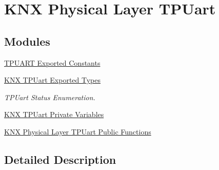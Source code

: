 \hypertarget{group___k_n_x___p_h___t_p_uart}{}\section{K\+NX Physical Layer T\+P\+Uart}
\label{group___k_n_x___p_h___t_p_uart}
\subsection*{Modules}
\begin{DoxyCompactItemize}
\item 
\hyperlink{group___k_n_x___p_h___t_p_uart___exported___constants}{T\+P\+U\+A\+R\+T Exported Constants}
\item 
\hyperlink{group___k_n_x___t_p_uart___exported___types}{K\+N\+X T\+P\+Uart Exported Types}
\begin{DoxyCompactList}\small\item\em T\+P\+Uart Status Enumeration. \end{DoxyCompactList}\item 
\hyperlink{group___k_n_x___p_h___t_p_u_a_r_t___private___variables}{K\+N\+X T\+P\+Uart Private Variables}
\item 
\hyperlink{group___k_n_x___p_h___t_p_uart___exported___functions}{K\+N\+X Physical Layer T\+P\+Uart Public Functions}
\end{DoxyCompactItemize}


\subsection{Detailed Description}
